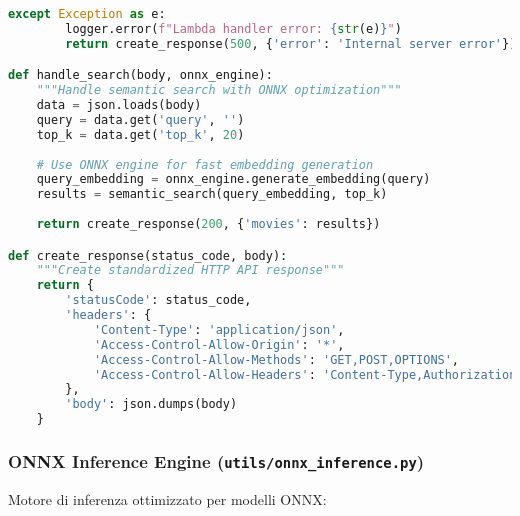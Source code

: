 \documentclass[11pt,a4paper]{article}
\begin{document}
\begin{lstlisting}[language=Python, caption=Lambda Handler - Router Centralizzato]
    except Exception as e:
        logger.error(f"Lambda handler error: {str(e)}")
        return create_response(500, {'error': 'Internal server error'})

def handle_search(body, onnx_engine):
    """Handle semantic search with ONNX optimization"""
    data = json.loads(body)
    query = data.get('query', '')
    top_k = data.get('top_k', 20)
    
    # Use ONNX engine for fast embedding generation
    query_embedding = onnx_engine.generate_embedding(query)
    results = semantic_search(query_embedding, top_k)
    
    return create_response(200, {'movies': results})

def create_response(status_code, body):
    """Create standardized HTTP API response"""
    return {
        'statusCode': status_code,
        'headers': {
            'Content-Type': 'application/json',
            'Access-Control-Allow-Origin': '*',
            'Access-Control-Allow-Methods': 'GET,POST,OPTIONS',
            'Access-Control-Allow-Headers': 'Content-Type,Authorization'
        },
        'body': json.dumps(body)
    }
\end{lstlisting}\subsubsection{ONNX Inference Engine (\texttt{utils/onnx\_inference.py})}
Motore di inferenza ottimizzato per modelli ONNX:
\end{document}
